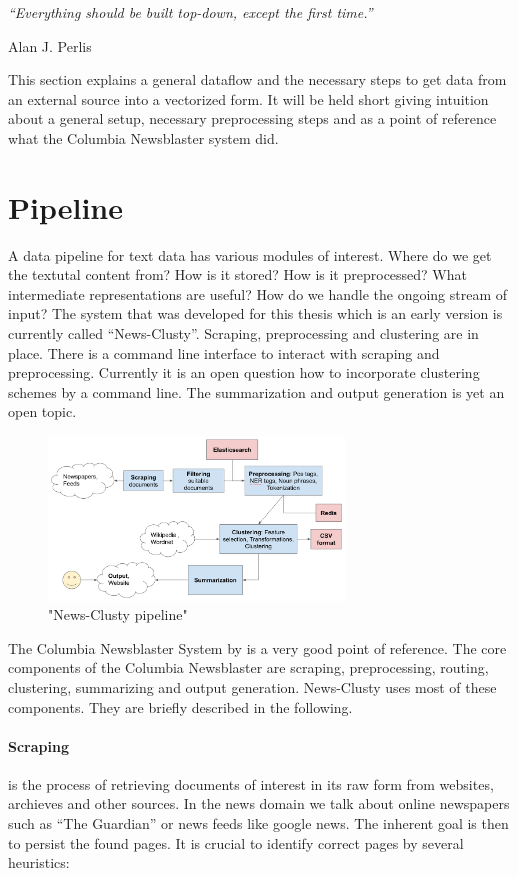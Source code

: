 \epigraph{\emph{
  ``Everything should be built top-down, except the first time.''
}}{ Alan J. Perlis }
 
This section explains a general dataflow and the necessary steps to get data from an external source into a vectorized form. It will be held short giving intuition about a general setup, necessary preprocessing steps and as a point of reference what the Columbia Newsblaster system did.

\section{Pipeline}
  A data pipeline for text data has various modules of interest. Where do we get the textutal content from? How is it stored? How is it preprocessed? What intermediate representations are useful? How do we handle the ongoing stream of input? The system that was developed for this thesis which is an early version is currently called ``News-Clusty''. Scraping, preprocessing and clustering are in place. There is a command line interface to interact with scraping and preprocessing. Currently it is an open question how to incorporate clustering schemes by a command line. The summarization and output generation is yet an open topic.

  \begin{figure}[h!]
    \centering
      \includegraphics[width=0.7\textwidth]{news_clusty.png}
      \caption{"News-Clusty pipeline"}
      \label{news_clusty}
  \end{figure}

  The Columbia Newsblaster System by \cite{ColumbiaMultiDoc2001} is a very good point of reference. The core components of the Columbia Newsblaster are scraping, preprocessing, routing, clustering, summarizing and output generation. News-Clusty uses most of these components. They are briefly described in the following.

  \paragraph{Scraping} is the process of retrieving documents of interest in its raw form from websites, archieves and other sources. In the news domain we talk about online newspapers such as ``The Guardian'' or news feeds like google news. The inherent goal is then to persist the found pages. It is crucial to identify correct pages by several heuristics:

